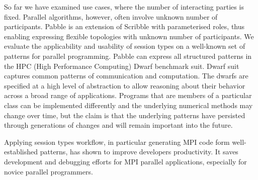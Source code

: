 
So far we have examined use cases, where the number of interacting parties is fixed. Parallel algorithms, however, often involve unknown number of participants. 
Pabble is an extension of Scribble with parameterised roles, thus enabling expressing flexible topologies with unknown number of participants. We evaluate the applicability and usability of session types on a well-known set of patterns for parallel programming. Pabble can express all structured patterns in the HPC (High Performance Computing) Dwarf benchmark suit. Dwarf suit captures common patterns of communication and computation. %
The dwarfs are specified at a high level of abstraction to allow reasoning about their behavior across a broad range of applications. Programs that are members of a particular class can be implemented differently and the underlying numerical methods may change over time, but the claim is that the underlying patterns have persisted through generations of changes and will remain important into the future. 

Applying session types workflow, in particular generating MPI code form well-established patterns, has shown to improve developers productivity. It saves development and debugging efforts for MPI parallel applications, especially for novice parallel programmers.  

